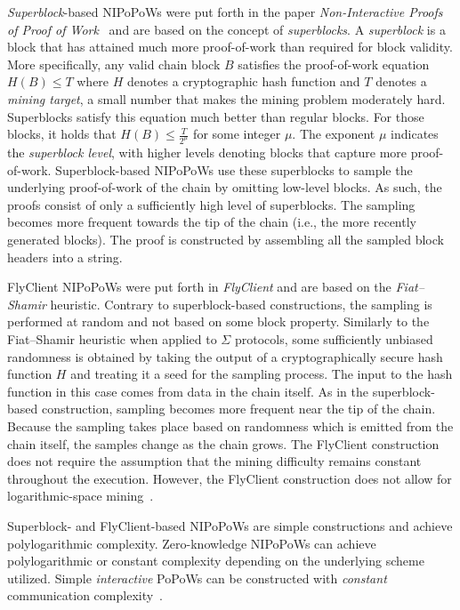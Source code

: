 \documentclass[runningheads]{format/llncs}
\begin{document}
\emph{Superblock}-based NIPoPoWs were put forth in the paper \emph{Non-Interactive Proofs of Proof of Work}~\cite{nipopows} and are based on the concept of \emph{superblocks}. A \emph{superblock} is a block that has attained much more proof-of-work than required for block validity. More specifically, any valid chain block $B$ satisfies the proof-of-work equation $H(B) \leq T$ where $H$ denotes a cryptographic hash function and $T$ denotes a \emph{mining target}, a small number that makes the mining problem moderately hard. Superblocks satisfy this equation much better than regular blocks. For those blocks, it holds that $H(B) \leq \frac{T}{2^\mu}$ for some integer $\mu$. The exponent $\mu$ indicates the \emph{superblock level}, with higher levels denoting blocks that capture more proof-of-work. Superblock-based NIPoPoWs use these superblocks to sample the underlying proof-of-work of the chain by omitting low-level blocks. As such, the proofs consist of only a sufficiently high level of superblocks. The sampling becomes more frequent towards the tip of the chain (i.e., the more recently generated blocks). The proof is constructed by assembling all the sampled block headers into a string.

FlyClient NIPoPoWs were put forth in \emph{FlyClient} \cite{flyclient} and are based on the \emph{Fiat--Shamir} heuristic. Contrary to superblock-based constructions, the sampling is performed at random and not based on some block property. Similarly to the Fiat--Shamir heuristic when applied to $\Sigma$ protocols, some sufficiently unbiased randomness is obtained by taking the output of a cryptographically secure hash function $H$ and treating it a seed for the sampling process. The input to the hash function in this case comes from data in the chain itself. As in the superblock-based construction, sampling becomes more frequent near the tip of the chain. Because the sampling takes place based on randomness which is emitted from the chain itself, the samples change as the chain grows. The FlyClient construction does not require the assumption that the mining difficulty remains constant throughout the execution. However, the FlyClient construction does not allow for logarithmic-space mining~\cite{logspace}.

Superblock- and FlyClient-based NIPoPoWs are simple constructions and achieve polylogarithmic complexity. Zero-knowledge NIPoPoWs can achieve polylogarithmic or constant complexity depending on the underlying scheme utilized. Simple \emph{interactive} PoPoWs can be constructed with \emph{constant} communication complexity~\cite{glimpse}.
\end{document}
